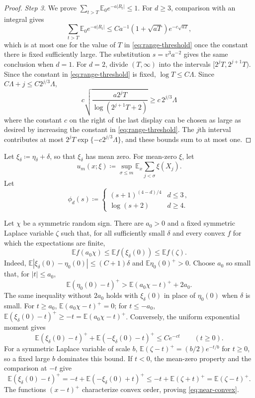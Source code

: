 \documentclass[11pt]{amsart}
\theoremstyle{plain}
\theoremstyle{definition}
\newcommand{\E}{\mathbb{E}}
\begin{document}
\begin{proof}
	\smallskip
	\noindent\emph{Step 3.} We prove
	$\sum_{t>T}\E_0e^{-a|R_t|}\leq1$.
	For $d\geq3$, comparison with an integral gives
	\[
		\sum_{t>T}\E_0e^{-a|R_t|}
		\leq Ca^{-1}(1+\sqrt{aT})e^{-c\sqrt{aT}},
	\]
	which is at most one for the value of $T$ in \eqref{eq:range-threshold} once
	the constant there is fixed sufficiently large. The substitution $s=v^3a^{-2}$ gives the
	same conclusion when $d=1$. For $d=2$, divide $(T,\infty)$ into the
	intervals $[2^jT,2^{j+1}T)$. Since the constant in
	\eqref{eq:range-threshold} is fixed, $\log T\leq C\Lambda$. Since
	$C\Lambda+j\leq C2^{j/3}\Lambda$,
	\[
		c\sqrt{\frac{a2^jT}{\log(2^{j+1}T+2)}}
		\geq c\,2^{j/3}\Lambda
	\]
	where the constant $c$ on the right of the last display can be chosen as large as desired by increasing the constant in \eqref{eq:range-threshold}. The $j$th interval contributes at most $2^jT\exp\{-c2^{j/3}\Lambda\}$, and these bounds sum to at most one.
\end{proof}

Let $\xi_\delta\coloneqq\eta_\delta+\delta$, so that $\xi_\delta$ has mean zero. For
mean-zero $\xi$, let
\[
	u_m(x;\xi)\coloneqq\sup_{\sigma\leq m}\E_x\sum_{j<\sigma}\xi(X_j).
\]
Let
\[
	\phi_d(s)\coloneqq
	\begin{cases}
		(s+1)^{(4-d)/4}&d\leq3\,,\\
		\log(s+2)&d\geq4.
	\end{cases}
\]

Let $\chi$ be a symmetric random sign. There are $a_0>0$ and a fixed symmetric Laplace variable $\zeta$ such that, for all sufficiently small $\delta$ and every convex $f$ for which the expectations are finite,
\begin{equation}\label{eq:near-convex}
	\E f(a_0\chi)\leq\E f(\xi_\delta(0))\leq\E f(\zeta).
\end{equation}
Indeed, $\E|\xi_\delta(0)-\eta_0(0)|\leq(C+1)\delta$ and
$\E\eta_0(0)^+>0$. Choose $a_0$ so small that, for $|t|\leq a_0$,
\[
	\E(\eta_0(0)-t)^+>\E(a_0\chi-t)^++2a_0.
\]
The same inequality without $2a_0$ holds with $\xi_\delta(0)$ in place of
$\eta_0(0)$ when $\delta$ is small. For $t\geq a_0$, $\E(a_0\chi-t)^+=0$; for $t\leq-a_0$, $\E(\xi_\delta(0)-t)^+\geq-t=\E(a_0\chi-t)^+$. Conversely, the
uniform exponential moment gives
\[
	\E(\xi_\delta(0)-t)^++\E(-\xi_\delta(0)-t)^+\leq Ce^{-ct}\qquad(t\geq0).
\]
For a symmetric Laplace variable of scale $b$,
$\E(\zeta-t)^+=(b/2)e^{-t/b}$ for $t\geq0$, so a fixed large $b$ dominates this bound. If $t<0$, the mean-zero property and the comparison at $-t$ give
\[
	\E(\xi_\delta(0)-t)^+
	=-t+\E(-\xi_\delta(0)+t)^+
	\leq-t+\E(\zeta+t)^+=\E(\zeta-t)^+.
\]
The functions $(x-t)^+$ characterize convex order, proving
\eqref{eq:near-convex}.
\end{document}
